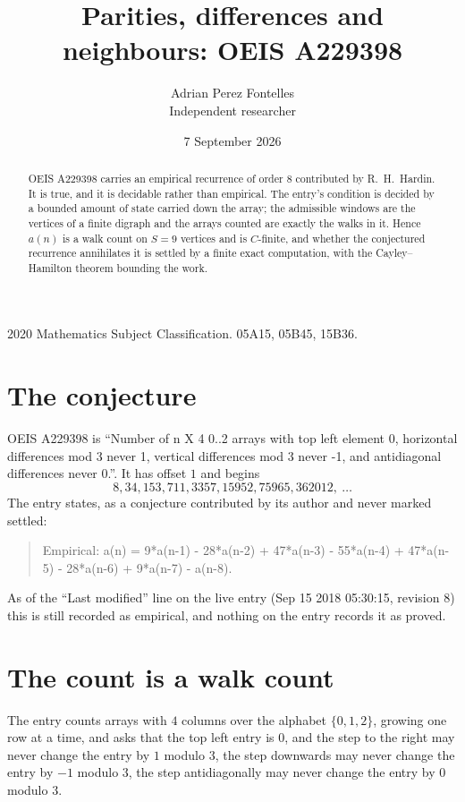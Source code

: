 \documentclass[11pt,a4paper]{article}
\title{Parities, differences and neighbours: OEIS A229398}
\author{Adrian Perez Fontelles\\ \small Independent researcher}
\date{7 September 2026}
\theoremstyle{plain}
\theoremstyle{definition}
\begin{document}
\maketitle

\begin{abstract}
OEIS A229398 carries an empirical recurrence of order $8$ contributed by R.~H.~Hardin. It is
true, and it is decidable rather than empirical. The entry's condition is decided by a bounded amount of state carried down the array; the
admissible windows are the vertices of a finite digraph and the arrays counted are exactly the
walks in it. Hence $a(n)$ is a walk count on $S=9$ vertices and is $C$-finite, and whether the
conjectured recurrence annihilates it is settled by a finite exact computation, with the
Cayley--Hamilton theorem bounding the work.
\end{abstract}

\noindent\small 2020 Mathematics Subject Classification. 05A15, 05B45, 15B36.\normalsize

\section{The conjecture}

OEIS A229398 is ``Number of n X 4 0..2 arrays with top left element 0, horizontal differences mod 3 never 1, vertical differences mod 3 never -1, and antidiagonal differences never 0.''. It has offset $1$ and begins
\[
8, 34, 153, 711, 3357, 15952, 75965, 362012,\ \dots
\]
The entry states, as a conjecture contributed by its author and never marked settled:
\begin{quote}
Empirical: a(n) = 9*a(n-1) - 28*a(n-2) + 47*a(n-3) - 55*a(n-4) + 47*a(n-5) - 28*a(n-6) + 9*a(n-7) - a(n-8).
\end{quote}
As of the ``Last modified'' line on the live entry (Sep 15 2018 05:30:15, revision 8) this is still
recorded as empirical, and nothing on the entry records it as proved.

\section{The count is a walk count}

The entry counts arrays with $4$ columns over the alphabet $\{0,1,2\}$, growing one row at a time, and asks that the top left entry is $0$, and the step to the right may never change the entry by $1$ modulo $3$, the step downwards may never change the entry by $-1$ modulo $3$, the step antidiagonally may never change the entry by $0$ modulo $3$.
\end{document}
